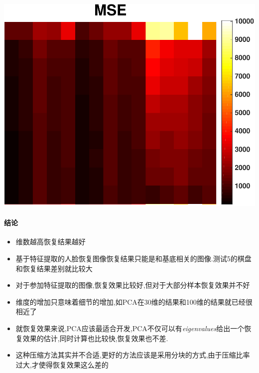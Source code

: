 \begin{center}
\begin{minipage}[t]{\linewidth}
\center
{
		\captionsetup{justification=centering}
\includegraphics[width=\textwidth]{Img/pni_rec_mse} 
\label{fig:ica_base}
}
\end{minipage}
\medskip
\end{center}

\paragraph{结论}
\begin{itemize}
	\item 维数越高恢复结果越好
	\item 基于特征提取的人脸恢复图像恢复结果只能是和基底相关的图像.测试5的棋盘和恢复结果差别就比较大
	\item 对于参加特征提取的图像,恢复效果比较好,但对于大部分样本恢复效果并不好
	\item 维度的增加只意味着细节的增加,如PCA在30维的结果和100维的结果就已经很相近了
	\item 就恢复效果来说,PCA应该最适合开发,PCA不仅可以有\textit{eigenvalues}给出一个恢复效果的估计,同时计算也比较快,恢复效果也不差.
	\item 这种压缩方法其实并不合适,更好的方法应该是采用分块的方式,由于压缩比率过大,才使得恢复效果这么差的
\end{itemize}


